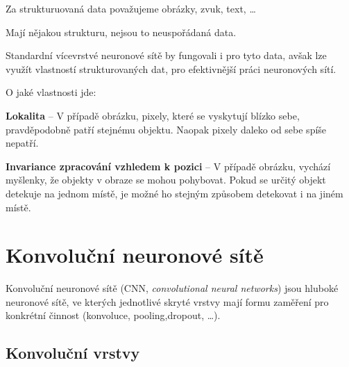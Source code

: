 \begin{compactitem}
    \item Za strukturuovaná data považujeme obrázky, zvuk, text, \dots \begin{compactitem}
        \item Mají nějakou strukturu, nejsou to neuspořádaná data.
    \end{compactitem}

    \item Standardní vícevrstvé neuronové sítě by fungovali i pro tyto data, avšak lze využít vlastností strukturovaných dat, pro efektivnější práci neuronových sítí.

    O jaké vlastnosti jde: \begin{compactitem}
        \item \textbf{Lokalita} -- V případě obrázku, pixely, které se vyskytují blízko sebe, pravděpodobně patří stejnému objektu. Naopak pixely daleko od sebe spíše nepatří.

        \item \textbf{Invariance zpracování vzhledem k pozici} -- V případě obrázku, vychází myšlenky, že objekty v obraze se mohou pohybovat. Pokud se určitý objekt detekuje na jednom místě, je možné ho stejným způsobem detekovat i na jiném místě.
    \end{compactitem}
\end{compactitem}


\section{Konvoluční neuronové sítě}

\begin{compactitem}
    \item Konvoluční neuronové sítě (CNN, \textit{convolutional neural networks}) jsou hluboké neuronové sítě, ve kterých jednotlivé skryté vrstvy mají formu zaměření pro konkrétní činnost (konvoluce, pooling,dropout, \dots).
\end{compactitem}

\subsection{Konvoluční vrstvy}


